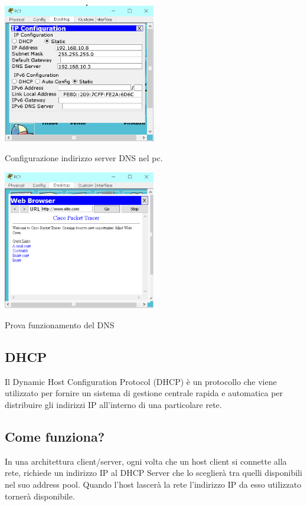 \begin{sfigure}
    \centering
    \captionsetup{type=figure}
    \includegraphics[width=0.5\textwidth]{images/06.servizi-rete/dns/02.conf-pc.png}
    \caption{Configurazione indirizzo server DNS nel pc.}
    \label{fig:dns-conf-pc}
\end{sfigure}

\begin{sfigure}
    \centering
    \captionsetup{type=figure}
    \includegraphics[width=0.5\textwidth]{images/06.servizi-rete/dns/03.test.png}
    \caption{Prova funzionamento del DNS}
    \label{fig:dns-test}
\end{sfigure}

\subsection{DHCP}
Il Dynamic Host Configuration Protocol (DHCP) è un protocollo che viene utilizzato per fornire un sistema di gestione centrale rapida e automatica per distribuire gli indirizzi IP all'interno di una particolare rete.

\subsection*{Come funziona?}
In una architettura client/server, ogni volta che un host client si connette alla rete, richiede un indirizzo IP al DHCP Server che lo sceglierà tra quelli disponibili nel suo address pool. Quando l’host lascerà la rete l’indirizzo IP da esso utilizzato tornerà disponibile.

